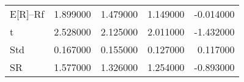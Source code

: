 \begin{tabular}{lrrrr}
\toprule
\midrule
E[R]--Rf & 1.899000 & 1.479000 & 1.149000 & -0.014000 \\
t & 2.528000 & 2.125000 & 2.011000 & -1.432000 \\
Std & 0.167000 & 0.155000 & 0.127000 & 0.117000 \\
SR & 1.577000 & 1.326000 & 1.254000 & -0.893000 \\
\bottomrule
\end{tabular}
